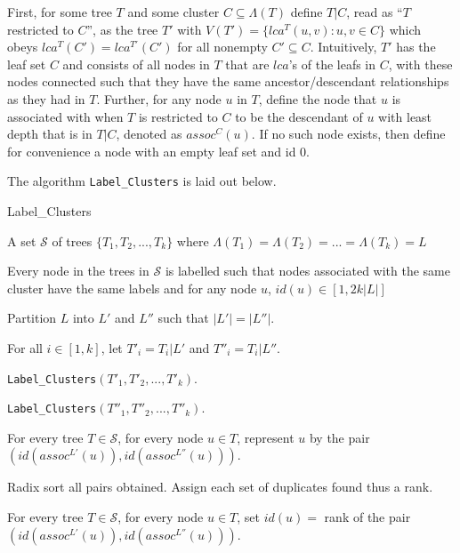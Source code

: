 \documentclass{article}
\newcommand{\leafset}{\Lambda}
\begin{document}
    First, for some tree $T$ and some cluster $C \subseteq \leafset(T)$ define $T|C$, read as ``$T$ restricted to $C$'', as the tree $T'$ with $V(T') = \{lca^T(u, v) : u, v \in C\}$ which obeys $lca^T(C') = lca^{T'}(C')$ for all nonempty $C' \subseteq C$. Intuitively, $T'$ has the leaf set $C$ and consists of all nodes in $T$ that are $lca$'s of the leafs in $C$, with these nodes connected such that they have the same ancestor/descendant relationships as they had in $T$. Further, for any node $u$ in $T$, define the node that $u$ is associated with when $T$ is restricted to $C$ to be the descendant of $u$ with least depth that is in $T|C$, denoted as $assoc^{C}(u)$. If no such node exists, then define for convenience a node with an empty leaf set and id $0$.

    The algorithm \texttt{Label\_Clusters} is laid out below.

    \begin{algorithm}
        \caption{Label\_Clusters}
        \label{alg:labelclusters}

        \begin{algorithmic}[1]
            \Input A set $\mathcal{S}$ of trees $\{T_1, T_2, ..., T_k\}$ where $\leafset(T_1) = \leafset(T_2) = ... = \leafset(T_k) = L$

            \Output Every node in the trees in $\mathcal{S}$ is labelled such that nodes associated with the same cluster have the same labels and for any node $u$, $id(u) \in [1, 2k |L|]$

            \State Partition $L$ into $L'$ and $L''$ such that $|L'| = |L''|$.

            \State For all $i \in [1,k]$, let $T'_i = T_i|L'$ and $T''_i = T_i|L''$.

            \State \texttt{Label\_Clusters}$(T'_1, T'_2, ..., T'_k)$.

            \State \texttt{Label\_Clusters}$(T''_1, T''_2, ..., T''_k)$.

            \State For every tree $T \in \mathcal{S}$, for every node $u \in T$, represent $u$ by the pair $(id(assoc^{L'}(u)), id(assoc^{L''}(u)))$.

            \State Radix sort all pairs obtained. Assign each set of duplicates found thus a rank.

            \State For every tree $T \in \mathcal{S}$, for every node $u \in T$, set $id(u) = $ rank of the pair $(id(assoc^{L'}(u)), id(assoc^{L''}(u)))$.
        \end{algorithmic}
    \end{algorithm}
\end{document}
